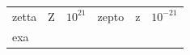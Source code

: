 {{\begin{center}
\begin{tabular}[t]{|l|l|l|l|l|l|}
    
        zetta &
    
    
        Z &
    
    
        
                \begin{math}{10}^{21}\end{math}
               &
    
    
        zepto &
    
    
        z &
    
    
        
                \begin{math}{10}^{-21}\end{math}
     \tabularnewline\cline{1-1}\cline{2-2}\cline{3-3}\cline{4-4}\cline{5-5}\cline{6-6}
    
    
        exa &
    
    

\end{tabular}
\end{center}}}
